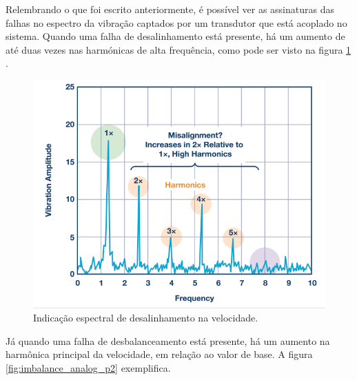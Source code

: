 Relembrando o que foi escrito anteriormente, é possível ver as assinaturas das falhas no espectro da vibração captados por um transdutor
que está acoplado no sistema. Quando uma falha de desalinhamento está presente, há um aumento de até duas vezes nas harmónicas de alta 
frequência, como pode ser visto na figura \ref{fig:misa_analog_p2} \cite{Sopcik2019}.

\begin{figure}[H]
    \caption{Indicação espectral de desalinhamento na velocidade.}
    \begin{center}
        \includegraphics[scale=.4]{referencial/img/misa_analog_p2.png}
    \end{center}
    \label{fig:misa_analog_p2}
\end{figure}

Já quando uma falha de desbalanceamento está presente, há um aumento na harmônica principal da velocidade, em relação ao valor de base.
A figura \ref{fig:imbalance_analog_p2} exemplifica.

